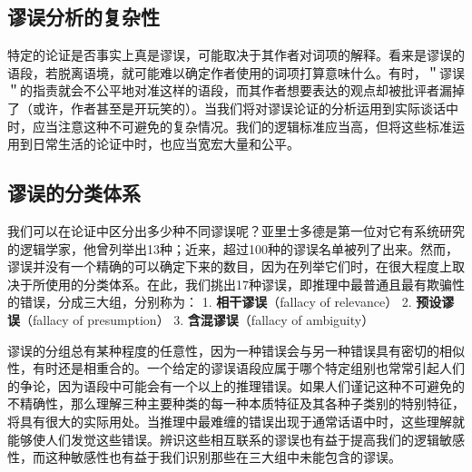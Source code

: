 \subsection{谬误分析的复杂性}

特定的论证是否事实上真是谬误，可能取决于其作者对词项的解释。看来是谬误的语段，若脱离语境，就可能难以确定作者使用的词项打算意味什么。有时，＂谬误＂的指责就会不公平地对准这样的语段，而其作者想要表达的观点却被批评者漏掉了（或许，作者甚至是开玩笑的）。当我们将对谬误论证的分析运用到实际谈话中时，应当注意这种不可避免的复杂情况。我们的逻辑标准应当高，但将这些标准运用到日常生活的论证中时，也应当宽宏大量和公平。

\subsection{谬误的分类体系}

我们可以在论证中区分出多少种不同谬误呢？亚里士多德是第一位对它有系统研究的逻辑学家，他曾列举出13种\cite{aristotle}；近来，超过100种的谬误名单被列了出来。\cite{fearnside1959}然而，谬误并没有一个精确的可以确定下来的数目，因为在列举它们时，在很大程度上取决于所使用的分类体系。在此，我们挑出17种谬误，即推理中最普通且最有欺骗性的错误，分成三大组，分别称为：
1. \textbf{相干谬误}（fallacy of relevance）
2. \textbf{预设谬误}（fallacy of presumption）
3. \textbf{含混谬误}（fallacy of ambiguity）\cite{joseph1916}

谬误的分组总有某种程度的任意性，因为一种错误会与另一种错误具有密切的相似性，有时还是相重合的。一个给定的谬误语段应属于哪个特定组别也常常引起人们的争论，因为语段中可能会有一个以上的推理错误。如果人们谨记这种不可避免的不精确性，那么理解三种主要种类的每一种本质特征及其各种子类别的特别特征，将具有很大的实际用处。当推理中最难缠的错误出现于通常话语中时，这些理解就能够使人们发觉这些错误。辨识这些相互联系的谬误也有益于提高我们的逻辑敏感性，而这种敏感性也有益于我们识别那些在三大组中未能包含的谬误。

